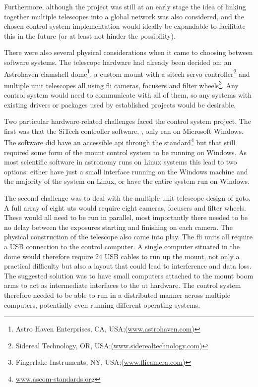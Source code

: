 \begin{colsection}
\begin{colsection}
Furthermore, although the project was still at an early stage the idea of linking together multiple telescopes into a global network was also considered, and the chosen control system implementation would ideally be expandable to facilitate this in the future (or at least not hinder the possibility).

There were also several physical considerations when it came to choosing between software systems. The telescope hardware had already been decided on: an Astrohaven clamshell dome\footnote{Astro Haven Enterprises, CA, USA;\@ (\url{www.astrohaven.com})}, a custom mount with a \gls{sitech} servo controller\footnote{Sidereal Technology, OR, USA;\@ (\url{www.siderealtechnology.com})} and multiple unit telescopes all using \gls{fli} cameras, focusers and filter wheels\footnote{Fingerlake Instruments, NY, USA;\@ (\url{www.flicamera.com})}. Any control system would need to communicate with all of them, so any systems with existing drivers or packages used by established projects would be desirable.

Two particular hardware-related challenges faced the control system project. The first was that the SiTech controller software, , only ran on Microsoft Windows. The software did have an accessible \gls{api} through the  standard\footnote{\url{www.ascom-standards.org}} but that still required some form of the mount control system to be running on Windows. As most scientific software in astronomy runs on Linux systems this lead to two options: either have just a small interface running on the Windows machine and the majority of the system on Linux, or have the entire system run on Windows.

The second challenge was to deal with the multiple-unit telescope design of \gls{goto}. A full array of eight \glspl{ut} would require eight cameras, focusers and filter wheels. These would all need to be run in parallel, most importantly there needed to be no delay between the exposures starting and finishing on each camera. The physical construction of the telescope also came into play. The \gls{fli} units all require a USB connection to the control computer. A single computer situated in the dome would therefore require 24 USB cables to run up the mount, not only a practical difficulty but also a layout that could lead to interference and data loss. The suggested solution was to have small computers attached to the mount boom arms to act as intermediate interfaces to the \gls{ut} hardware. The control system therefore needed to be able to run in a distributed manner across multiple computers, potentially even running different operating systems.


\end{colsection}
\end{colsection}
